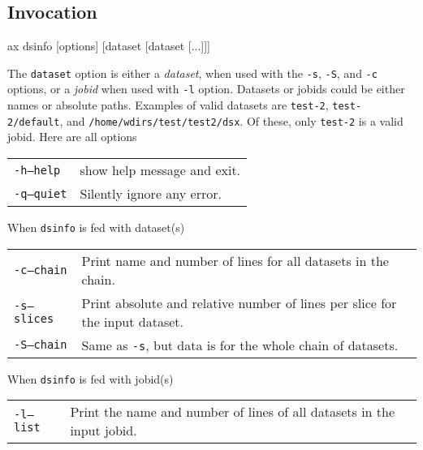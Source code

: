 \subsection{Invocation}
\begin{shell}
ax dsinfo [options] [dataset [dataset [...]]]
\end{shell}

The \texttt{dataset} option is either a \textsl{dataset}, when used
with the \texttt{-s}, \texttt{-S}, and \texttt{-c} options, or a
\textsl{jobid} when used with \texttt{-l} option.  Datasets or jobids
could be either names or absolute paths.  Examples of valid datasets
are \texttt{test-2}, \texttt{test-2/default}, and
\texttt{/home/wdirs/test/test2/dsx}.  Of these, only \texttt{test-2}
is a valid jobid.
Here are all options
\begin{snugshade}
\begin{tabular}{p{4cm}p{9cm}}
  \texttt{-h}\hspace{3cm}\texttt{---help} & show help message and exit.\\[4ex]
  \texttt{-q}\hspace{3cm}\texttt{---quiet} & Silently ignore any error.\\
\end{tabular}
\end{snugshade}
When \texttt{dsinfo} is fed with dataset(s)
\begin{snugshade}
\begin{tabular}{p{4cm}p{9cm}}
  \texttt{-c}\hspace{3cm}\texttt{---chain} & Print name and number of
  lines for all datasets in the chain.\\[4ex]
  \texttt{-s}\hspace{3cm}\texttt{---slices} & Print absolute and
  relative number of lines per slice for the input dataset.\\[2ex]
  \texttt{-S}\hspace{3cm}\texttt{---chain} & Same as \texttt{-s}, but
  data is for the whole chain of datasets.\\
\end{tabular}
\end{snugshade}
When \texttt{dsinfo} is fed with jobid(s)
\begin{snugshade}
\begin{tabular}{p{4cm}p{9cm}}
  \texttt{-l}\hspace{3cm}\texttt{---list} & Print the name and number
  of lines of all datasets in the input jobid.\\
\end{tabular}
\end{snugshade}

